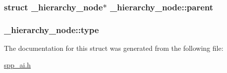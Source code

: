 \label{struct__hierarchy__node_a849256ce1039e2cefaaf64d91171be0a}
\hypertarget{struct__hierarchy__node_a5c94c89d7e2aea393f1c550afb766bbe}{
\subsubsection[{parent}]{\setlength{\rightskip}{0pt plus 5cm}struct {\bf \_\-hierarchy\_\-node}$\ast$ {\bf \_\-hierarchy\_\-node::parent}}}
\label{struct__hierarchy__node_a5c94c89d7e2aea393f1c550afb766bbe}
\hypertarget{struct__hierarchy__node_a3b18e3ddfa2212c5e4ff9c0b4bde4296}{
\subsubsection[{type}]{ {\bf \_\-hierarchy\_\-node::type}}}
\label{struct__hierarchy__node_a3b18e3ddfa2212c5e4ff9c0b4bde4296}


The documentation for this struct was generated from the following file:\begin{DoxyCompactItemize}
\item 
\hyperlink{spp__ai_8h}{spp\_\-ai.h}\end{DoxyCompactItemize}
